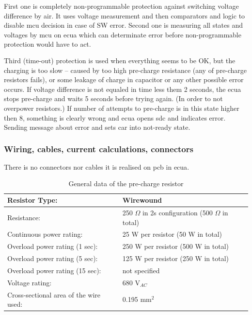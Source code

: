 First one is completely non-programmable protection against switching voltage difference by \gls{air}. It uses voltage measurement and then comparators and logic to disable \gls{mcu} decision in case of SW error.
Second one is measuring all states and voltages by \gls{mcu} on \gls{ecua} which can determinate error before non-programmable protection would have to act.

Third (time-out) protection is used when everything seems to be OK, but the charging is too slow – caused by too high pre-charge resistance (any of pre-charge resistors fails), or some leakage of charge in capacitor or any other possible error occurs. If voltage difference is not equaled in time less them 2 seconds, the \gls{ecua} stops pre-charge and waits 5 seconds before trying again. (In order to not overpower resistors.) If number of attempts to pre-charge is in this state higher then 8, something is clearly wrong and \gls{ecua} opens \gls{sdc} and indicates error. Sending message about error and sets car into not-ready state.

\subsubsection{Wiring, cables, current calculations, connectors}

There is no connectors nor cables it is realised on \gls{pcb} in \gls{ecua}. 


\begin{table}[H]
	\centering
	\caption{General data of the pre-charge resistor}
	\begin{tabularx}{\textwidth}{|X|X|}
		\hline
		Resistor Type: & Wirewound \\[\TableSize]
		\hline

		Resistance: & 250 $\Omega$ in 2s configuration (500 $\Omega$ in total) \\[\TableSize]
		\hline
		Continuous power rating: & 25 W per resistor (50 W  in total)\\[\TableSize]
		\hline
		Overload power rating (1 sec): & 250 W per resistor (500 W in total) \\[\TableSize]
		\hline
		Overload power rating (5 sec): & 125 W per resistor (250 W in total) \\[\TableSize]
		\hline
		Overload power rating (15 sec): & not specified \\[\TableSize]
		\hline
		Voltage rating: & 680 V$_{AC}$\\[\TableSize]
		\hline
		Cross-sectional area of the wire used: & 0.195 mm$^2$\\[\TableSize]
		\hline
	\end{tabularx}%
	\label{tab:precharge-general}%
\end{table}%

